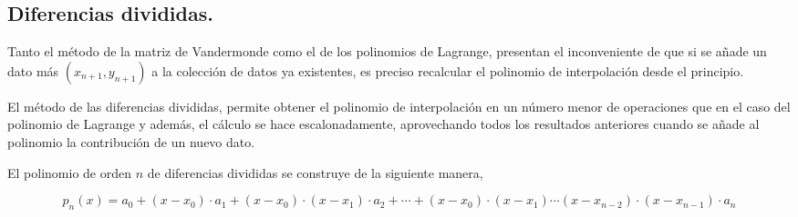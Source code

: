 \begin{paracol}{2}
\section{Diferencias divididas.}\label{sec:difdiv}  
Tanto el método de la matriz de Vandermonde como el de los polinomios de Lagrange, presentan el inconveniente de que si se añade un dato más $(x_{n+1}, y_{n+1})$ a la colección de datos ya existentes, es preciso recalcular el polinomio de interpolación desde el principio. 

El método de las diferencias divididas, permite obtener el polinomio de interpolación en un número menor de operaciones que en el caso del polinomio de Lagrange y además, el cálculo se hace escalonadamente, aprovechando todos los resultados anteriores cuando se añade al polinomio la contribución de un nuevo dato.

El polinomio de orden $n$ de diferencias divididas se construye de la siguiente manera,
\end{paracol}
\begin{equation*}
p_n(x)=a_0+(x-x_0)\cdot a_1+(x-x_0)\cdot (x-x_1)\cdot a_2+\cdots +(x-x_0)\cdot (x-x_1)\cdots (x-x_{n-2})\cdot(x-x_{n-1})\cdot a_n
\end{equation*}

